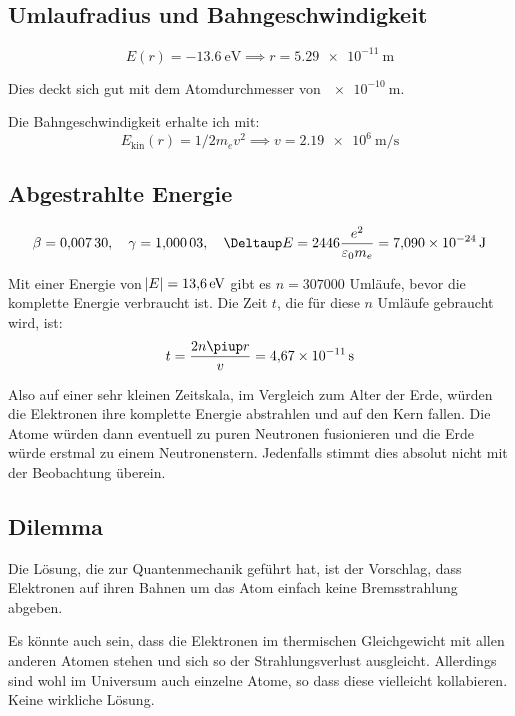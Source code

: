\subsection{Umlaufradius und Bahngeschwindigkeit}

\[
	E(r) = \SI{-13.6}{\electronvolt}
	\implies
	r = \SI{5.29e-11}{\meter}
\]

Dies deckt sich gut mit dem Atomdurchmesser von $\SI{e-10}{\meter}$.

Die Bahngeschwindigkeit erhalte ich mit:
\[
	E_\text{kin}(r) = 1/2 m_e v^2
	\implies
	v = \SI{2.19e6}{\meter\per\second}
\]

\subsection{Abgestrahlte Energie}

\[
	\beta = \num{0.00730}
	\eqnsep
	\gamma = \num{1.00003}
	\eqnsep
	\Deltaup E = \num{2446} \frac{e^2}{\varepsilon_0 m_e} = \SI{7.090e-24}\joule
\]

Mit einer Energie von $\abs E = \SI{13.6}\electronvolt$ gibt es $n =
\num{307000}$ Umläufe, bevor die komplette Energie verbraucht ist. Die Zeit
$t$, die für diese $n$ Umläufe gebraucht wird, ist:
\[
	t = \frac{2 n \piup r}v = \SI{4.67e-11}\second
\]

Also auf einer sehr kleinen Zeitskala, im Vergleich zum Alter der Erde, würden
die Elektronen ihre komplette Energie abstrahlen und auf den Kern fallen. Die
Atome würden dann eventuell zu puren Neutronen fusionieren und die Erde würde
erstmal zu einem Neutronenstern. Jedenfalls stimmt dies absolut nicht mit der
Beobachtung überein.

\subsection{Dilemma}

Die Lösung, die zur Quantenmechanik geführt hat, ist der Vorschlag, dass
Elektronen auf ihren Bahnen um das Atom einfach keine Bremsstrahlung abgeben.

Es könnte auch sein, dass die Elektronen im thermischen Gleichgewicht mit allen
anderen Atomen stehen und sich so der Strahlungsverlust ausgleicht. Allerdings
sind wohl im Universum auch einzelne Atome, so dass diese vielleicht
kollabieren. Keine wirkliche Lösung.


\IfFileExists{\bibliographyfile}{
}{}



